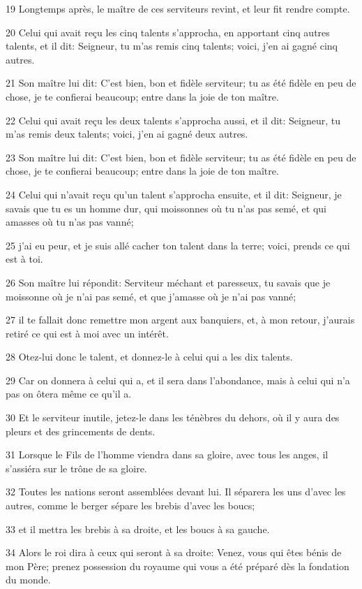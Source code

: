 \par 19 Longtemps après, le maître de ces serviteurs revint, et leur fit rendre compte.
\par 20 Celui qui avait reçu les cinq talents s'approcha, en apportant cinq autres talents, et il dit: Seigneur, tu m'as remis cinq talents; voici, j'en ai gagné cinq autres.
\par 21 Son maître lui dit: C'est bien, bon et fidèle serviteur; tu as été fidèle en peu de chose, je te confierai beaucoup; entre dans la joie de ton maître.
\par 22 Celui qui avait reçu les deux talents s'approcha aussi, et il dit: Seigneur, tu m'as remis deux talents; voici, j'en ai gagné deux autres.
\par 23 Son maître lui dit: C'est bien, bon et fidèle serviteur; tu as été fidèle en peu de chose, je te confierai beaucoup; entre dans la joie de ton maître.
\par 24 Celui qui n'avait reçu qu'un talent s'approcha ensuite, et il dit: Seigneur, je savais que tu es un homme dur, qui moissonnes où tu n'as pas semé, et qui amasses où tu n'as pas vanné;
\par 25 j'ai eu peur, et je suis allé cacher ton talent dans la terre; voici, prends ce qui est à toi.
\par 26 Son maître lui répondit: Serviteur méchant et paresseux, tu savais que je moissonne où je n'ai pas semé, et que j'amasse où je n'ai pas vanné;
\par 27 il te fallait donc remettre mon argent aux banquiers, et, à mon retour, j'aurais retiré ce qui est à moi avec un intérêt.
\par 28 Otez-lui donc le talent, et donnez-le à celui qui a les dix talents.
\par 29 Car on donnera à celui qui a, et il sera dans l'abondance, mais à celui qui n'a pas on ôtera même ce qu'il a.
\par 30 Et le serviteur inutile, jetez-le dans les ténèbres du dehors, où il y aura des pleurs et des grincements de dents.
\par 31 Lorsque le Fils de l'homme viendra dans sa gloire, avec tous les anges, il s'assiéra sur le trône de sa gloire.
\par 32 Toutes les nations seront assemblées devant lui. Il séparera les uns d'avec les autres, comme le berger sépare les brebis d'avec les boucs;
\par 33 et il mettra les brebis à sa droite, et les boucs à sa gauche.
\par 34 Alors le roi dira à ceux qui seront à sa droite: Venez, vous qui êtes bénis de mon Père; prenez possession du royaume qui vous a été préparé dès la fondation du monde.
